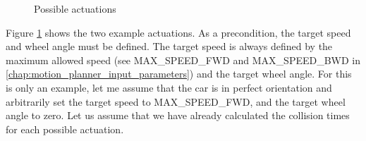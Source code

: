 \begin{figure}[!ht]
    \centering
    \caption{Possible actuations}
    \label{possible_actuations}
\end{figure}

Figure \ref{possible_actuations} shows the two example actuations. As a precondition, the target speed and wheel angle must be defined. The target speed is always defined by the maximum allowed speed (see MAX\_SPEED\_FWD and MAX\_SPEED\_BWD in \ref{chap:motion_planner_input_parameters}) and the target wheel angle. For this is only an example, let me assume that the car is in perfect orientation and arbitrarily set the target speed to MAX\_SPEED\_FWD, and the target wheel angle to zero. Let us assume that we have already calculated the collision times for each possible actuation.

